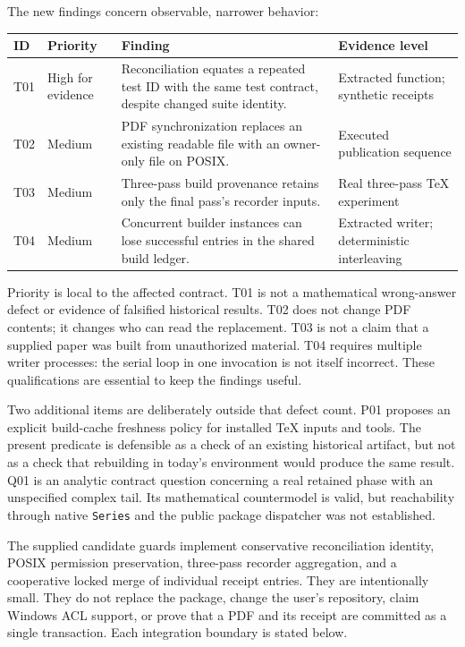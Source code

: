 \documentclass[11pt,letterpaper]{article}
\newcommand{\code}[1]{\nolinkurl{#1}}
\begin{document}
The new findings concern observable, narrower behavior:

\begin{center}\small
\begin{tabularx}{\textwidth}{@{}p{.48in}p{.68in}Yp{1.2in}@{}}
\toprule
ID & Priority & Finding & Evidence level\\
\midrule
T01 & High for evidence & Reconciliation equates a repeated test ID with the same test contract, despite changed suite identity. & Extracted function; synthetic receipts\\
T02 & Medium & PDF synchronization replaces an existing readable file with an owner-only file on POSIX. & Executed publication sequence\\
T03 & Medium & Three-pass build provenance retains only the final pass's recorder inputs. & Real three-pass TeX experiment\\
T04 & Medium & Concurrent builder instances can lose successful entries in the shared build ledger. & Extracted writer; deterministic interleaving\\
\bottomrule
\end{tabularx}
\end{center}

Priority is local to the affected contract. T01 is not a mathematical
wrong-answer defect or evidence of falsified historical results. T02 does not
change PDF contents; it changes who can read the replacement. T03 is not a claim
that a supplied paper was built from unauthorized material. T04 requires
multiple writer processes: the serial loop in one invocation is not itself
incorrect. These qualifications are essential to keep the findings useful.

Two additional items are deliberately outside that defect count. P01 proposes
an explicit build-cache freshness policy for installed TeX inputs and tools.
The present predicate is defensible as a check of an existing historical
artifact, but not as a check that rebuilding in today's environment would
produce the same result. Q01 is an analytic contract question concerning a
real retained phase with an unspecified complex tail. Its mathematical
countermodel is valid, but reachability through native \code{Series} and the
public package dispatcher was not established.

The supplied candidate guards implement conservative reconciliation identity,
POSIX permission preservation, three-pass recorder aggregation, and a
cooperative locked merge of individual receipt entries. They are intentionally
small. They do not replace the package, change the user's repository, claim
Windows ACL support, or prove that a PDF and its receipt are committed as a
single transaction. Each integration boundary is stated below.
\end{document}
